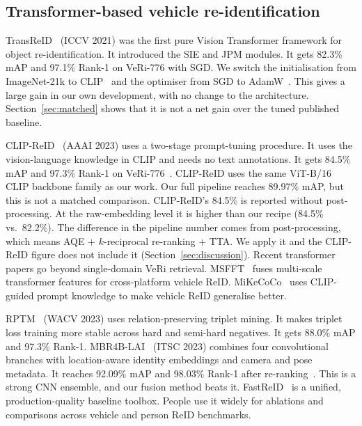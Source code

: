 \subsection{Transformer-based vehicle re-identification}
TransReID~\cite{he2021transreid} (ICCV 2021) was the first pure Vision Transformer framework for object re-identification. It introduced the SIE and JPM modules. It gets 82.3\% mAP and 97.1\% Rank-1 on VeRi-776 with SGD. We switch the initialisation from ImageNet-21k to CLIP~\cite{radford2021clip} and the optimiser from SGD to AdamW~\cite{loshchilov2019adamw}. This gives a large gain in our own development, with no change to the architecture. Section~\ref{sec:matched} shows that it is not a net gain over the tuned published baseline.

CLIP-ReID~\cite{li2023clipreid} (AAAI 2023) uses a two-stage prompt-tuning procedure. It uses the vision-language knowledge in CLIP and needs no text annotations. It gets 84.5\% mAP and 97.3\% Rank-1 on VeRi-776~\cite{opencodepapers2024veri}. CLIP-ReID uses the same ViT-B/16 CLIP backbone family as our work. Our full pipeline reaches 89.97\% mAP, but this is not a matched comparison. CLIP-ReID's 84.5\% is reported without post-processing. At the raw-embedding level it is higher than our recipe (84.5\% vs.\ 82.2\%). The difference in the pipeline number comes from post-processing, which means AQE $+$ $k$-reciprocal re-ranking $+$ TTA. We apply it and the CLIP-ReID figure does not include it (Section~\ref{sec:discussion}). Recent transformer papers go beyond single-domain VeRi retrieval. MSFFT~\cite{holla2024msfft} fuses multi-scale transformer features for cross-platform vehicle ReID. MiKeCoCo~\cite{kuang2025mikecoco} uses CLIP-guided prompt knowledge to make vehicle ReID generalise better.

RPTM~\cite{ghosh2023rptm} (WACV 2023) uses relation-preserving triplet mining. It makes triplet loss training more stable across hard and semi-hard negatives. It gets 88.0\% mAP and 97.3\% Rank-1. MBR4B-LAI~\cite{luo2023mbr4b} (ITSC 2023) combines four convolutional branches with location-aware identity embeddings and camera and pose metadata. It reaches 92.09\% mAP and 98.03\% Rank-1 after re-ranking~\cite{mbr4bcode}. This is a strong CNN ensemble, and our fusion method beats it. FastReID~\cite{wang2020fastreid} is a unified, production-quality baseline toolbox. People use it widely for ablations and comparisons across vehicle and person ReID benchmarks.

